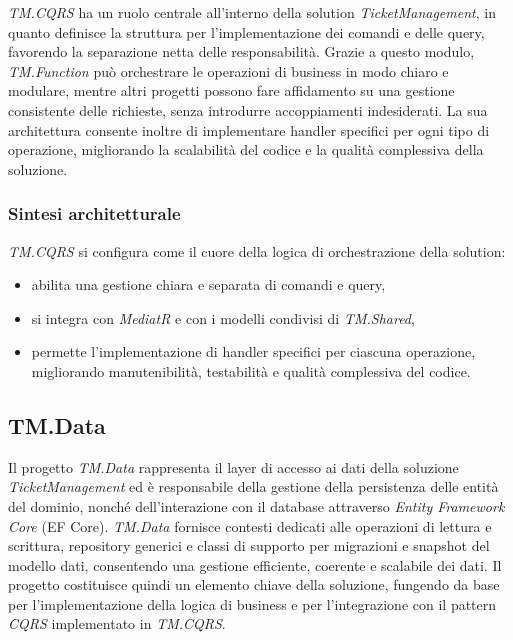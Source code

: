 \textit{TM.CQRS} ha un ruolo centrale all'interno della solution \textit{TicketManagement}, in quanto definisce la struttura per l'implementazione dei comandi e delle query, favorendo la separazione netta delle responsabilità. Grazie a questo modulo, \textit{TM.Function} può orchestrare le operazioni di business in modo chiaro e modulare, mentre altri progetti possono fare affidamento su una gestione consistente delle richieste, senza introdurre accoppiamenti indesiderati. La sua architettura consente inoltre di implementare handler specifici per ogni tipo di operazione, migliorando la scalabilità del codice e la qualità complessiva della soluzione.

\subsubsection{Sintesi architetturale}

\textit{TM.CQRS} si configura come il cuore della logica di orchestrazione della solution:
\begin{itemize}
\item abilita una gestione chiara e separata di comandi e query,
\item si integra con \textit{MediatR} e con i modelli condivisi di \textit{TM.Shared},
\item permette l'implementazione di handler specifici per ciascuna operazione, migliorando manutenibilità, testabilità e qualità complessiva del codice.
\end{itemize}

\subsection{TM.Data}

Il progetto \textit{TM.Data} rappresenta il layer di accesso ai dati della soluzione \textit{TicketManagement} ed è responsabile della gestione della persistenza delle entità del dominio, nonché dell'interazione con il database attraverso \textit{Entity Framework Core} (EF Core). \textit{TM.Data} fornisce contesti dedicati alle operazioni di lettura e scrittura, repository generici e classi di supporto per migrazioni e snapshot del modello dati, consentendo una gestione efficiente, coerente e scalabile dei dati. Il progetto costituisce quindi un elemento chiave della soluzione, fungendo da base per l'implementazione della logica di business e per l'integrazione con il pattern \textit{CQRS} implementato in \textit{TM.CQRS}.

